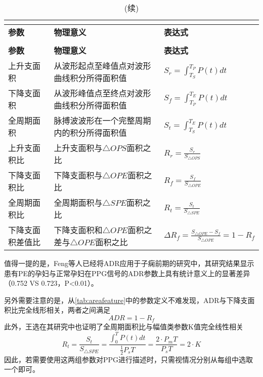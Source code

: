 \begin{center}
	\begin{longtable}{m{3.5cm}<{\centering}m{6.5cm}<{\centering}m{4.5cm}<{\centering}}
		\caption{PPG面积类参数示意}\\
		\label{tab:areafeature}\\
        \toprule
        \textbf{参数} & \textbf{物理意义} & \textbf{表达式} \\
        \midrule
        \endfirsthead
        \caption[]{(续)}\\
        \toprule
        \textbf{参数} & \textbf{物理意义} & \textbf{表达式} \\
        \midrule
        \endhead 
        \midrule
        \endfoot
        \bottomrule
        \endlastfoot
        上升支面积      &  从波形起点至峰值点对波形曲线积分所得面积值         &  $S_r=\int_{T_S}^{T_P}P(t)dt$\\
        下降支面积      &  从波形峰值点至终点对波形曲线积分所得面积值         &  $S_f=\int_{T_P}^{T_E}P(t)dt$\\
        全周期面积      &  脉搏波波形在一个完整周期内的积分所得面积值         &  $S_t=\int_{T_S}^{T_E}P(t)dt$\\
        上升支面积比    &  上升支面积与$\triangle OPS$面积之比         &   $R_r=\frac{S_r}{S_{\triangle OPS}}$    \\
        下降支面积比    &  下降支面积与$\triangle OPE$面积之比        &   $R_f=\frac{S_f}{S_{\triangle OPE}}$    \\
        全周期面积比    &  全周期面积与$\triangle SPE$面积之比         &   $R_t=\frac{S_t}{S_{\triangle SPE}}$    \\
        下降支面积差值比&  下降支面积和$\triangle OPE$面积之差与$\triangle OPE$面积之比        &    $\Delta R_f=\frac{S_{\triangle OPE}-S_f}{S_{\triangle OPE}}=1-R_f$\\
	\end{longtable}
\end{center}

值得一提的是，Feng等人已经将ADR应用于子痫前期的研究中，其研究结果显示患有PE的孕妇与正常孕妇在PPG信号的ADR参数上具有统计意义上的显著差异（0.752 VS 0.723，P<0.01）\cite{Feng2018}。

另外需要注意的是，从\autoref{tab:areafeature}中的参数定义不难发现，ADR与下降支面积比完全线形相关，两者之间满足
\begin{equation}
    \label{equ:adr}
    ADR = 1-R_f
\end{equation}
此外，王选在其研究中也证明了全周期面积比与幅值类参数K值完全线性相关\cite{Wang2012}
\begin{equation}
    \label{equ:kandart}
    R_t=\frac{S_t}{S_{\triangle SPE}}=\frac{\int_{0}^{T}P(t)dt}{\frac{1}{2}P_sT}=\frac{2\cdot P_mT}{P_sT}=2\cdot K
\end{equation}
因此，若需要使用这两组参数对PPG进行描述时，只需视情况分别从每组中选取一个即可。


